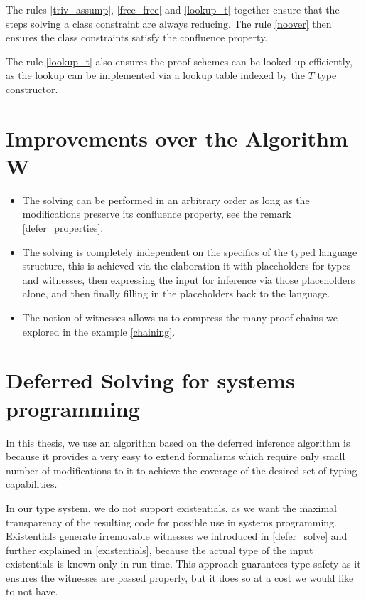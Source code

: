 The rules \ref{triv_assump}, \ref{free_free} and \ref{lookup_t} together ensure that the steps solving a class constraint are always reducing. The rule \ref{noover} then ensures the class constraints satisfy the confluence property.

The rule \ref{lookup_t} also ensures the proof schemes can be looked up efficiently, as the lookup can be implemented via a lookup table indexed by the $T$ type constructor.

\section{Improvements over the Algorithm W}

\begin{itemize}
    \item  The solving can be performed in an arbitrary order as long as the modifications preserve its confluence property, see the remark \ref{defer_properties}.

    \item The solving is completely independent on the specifics of the typed language structure, this is achieved via the elaboration it with placeholders for types and witnesses, then expressing the input for inference via those placeholders alone, and then finally filling in the placeholders back to the language.

    \item The notion of witnesses allows us to compress the many proof chains we explored in the example \ref{chaining}.
\end{itemize}



\section{Deferred Solving for systems programming}

In this thesis, we use an algorithm based on the deferred inference algorithm is because it provides a very easy to extend formalisms which require only small number of modifications to it to achieve the coverage of the desired set of typing capabilities.

In our type system, we do not support existentials, as we want the maximal transparency of the resulting code for possible use in systems programming. Existentials generate irremovable witnesses we introduced in \ref{defer_solve} and further explained in \ref{existentials}, because the actual type of the input existentials is known only in run-time. This approach guarantees type-safety as it ensures the witnesses are passed properly, but it does so at a cost we would like to not have.

